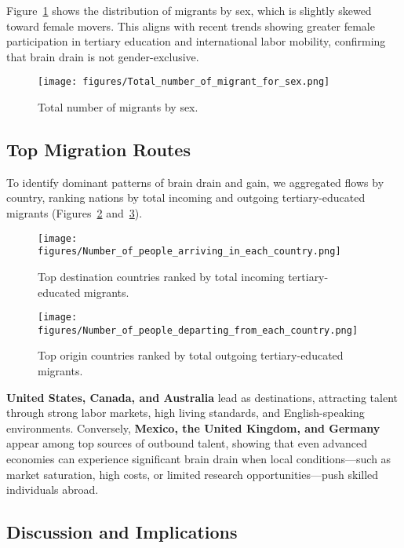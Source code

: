 \documentclass[11pt]{article}
\begin{document}
\medskip
\noindent
Figure~\ref{fig:gender} shows the distribution of migrants by sex, which is slightly skewed toward female movers. This aligns with recent trends showing greater female participation in tertiary education and international labor mobility, confirming that brain drain is not gender-exclusive.

\begin{figure}[H]
\centering
\texttt{[image: figures/Total\_number\_of\_migrant\_for\_sex.png]}
\caption{Total number of migrants by sex.}
\label{fig:gender}
\end{figure}

\subsection{Top Migration Routes}

\noindent
To identify dominant patterns of brain drain and gain, we aggregated flows by country, ranking nations by total incoming and outgoing tertiary-educated migrants (Figures~\ref{fig:arrivals} and~\ref{fig:departures}).

\begin{figure}[H]
\centering
\texttt{[image: figures/Number\_of\_people\_arriving\_in\_each\_country.png]}
\caption{Top destination countries ranked by total incoming tertiary-educated migrants.}
\label{fig:arrivals}
\end{figure}

\begin{figure}[H]
\centering
\texttt{[image: figures/Number\_of\_people\_departing\_from\_each\_country.png]}
\caption{Top origin countries ranked by total outgoing tertiary-educated migrants.}
\label{fig:departures}
\end{figure}

\noindent
\textbf{United States, Canada, and Australia} lead as destinations, attracting talent through strong labor markets, high living standards, and English-speaking environments. Conversely, \textbf{Mexico, the United Kingdom, and Germany} appear among top sources of outbound talent, showing that even advanced economies can experience significant brain drain when local conditions—such as market saturation, high costs, or limited research opportunities—push skilled individuals abroad.


\subsection{Discussion and Implications}
\end{document}
